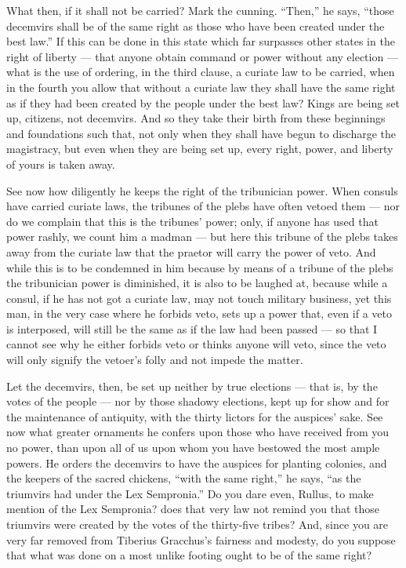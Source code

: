  What then, if it shall not be carried? Mark the cunning. ``Then,'' he says, ``those decemvirs shall be of the same right as those who have been created under the best law.'' If this can be done in this state which far surpasses other states in the right of liberty --- that anyone obtain command or power without any election --- what is the use of ordering, in the third clause, a curiate law to be carried, when in the fourth you allow that without a curiate law they shall have the same right as if they had been created by the people under the best law? Kings are being set up, citizens, not decemvirs. And so they take their birth from these beginnings and foundations such that, not only when they shall have begun to discharge the magistracy, but even when they are being set up, every right, power, and liberty of yours is taken away.

 See now how diligently he keeps the right of the tribunician power. When consuls have carried curiate laws, the tribunes of the plebs have often vetoed them --- nor do we complain that this is the tribunes' power; only, if anyone has used that power rashly, we count him a madman --- but here this tribune of the plebs takes away from the curiate law that the praetor will carry the power of veto. And while this is to be condemned in him because by means of a tribune of the plebs the tribunician power is diminished, it is also to be laughed at, because while a consul, if he has not got a curiate law, may not touch military business, yet this man, in the very case where he forbids veto, sets up a power that, even if a veto is interposed, will still be the same as if the law had been passed --- so that I cannot see why he either forbids veto or thinks anyone will veto, since the veto will only signify the vetoer's folly and not impede the matter.

 Let the decemvirs, then, be set up neither by true elections --- that is, by the votes of the people --- nor by those shadowy elections, kept up for show and for the maintenance of antiquity, with the thirty lictors for the auspices' sake. See now what greater ornaments he confers upon those who have received from you no power, than upon all of us upon whom you have bestowed the most ample powers. He orders the decemvirs to have the auspices for planting colonies, and the keepers of the sacred chickens, ``with the same right,'' he says, ``as the triumvirs had under the Lex Sempronia.'' Do you dare even, Rullus, to make mention of the Lex Sempronia? does that very law not remind you that those triumvirs were created by the votes of the thirty-five tribes? And, since you are very far removed from Tiberius Gracchus's fairness and modesty, do you suppose that what was done on a most unlike footing ought to be of the same right?

